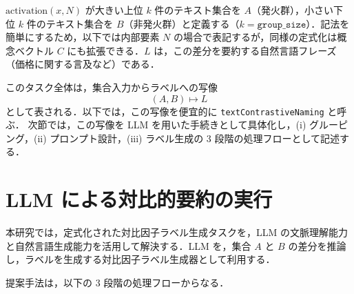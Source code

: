 $\text{activation}(x, N)$ が大きい上位 $k$ 件のテキスト集合を $A$（発火群），小さい下位 $k$ 件のテキスト集合を $B$（非発火群）と定義する（$k=\texttt{group\_size}$）．記法を簡単にするため，以下では内部要素 $N$ の場合で表記するが，同様の定式化は概念ベクトル $C$ にも拡張できる．$L$ は，この差分を要約する自然言語フレーズ（価格に関する言及など）である．

このタスク全体は，集合入力からラベルへの写像
\[
 (A, B) \mapsto L
\]
として表される．以下では，この写像を便宜的に \texttt{textContrastiveNaming} と呼ぶ．
次節では，この写像を LLM を用いた手続きとして具体化し，(i) グルーピング，(ii) プロンプト設計，(iii) ラベル生成の 3 段階の処理フローとして記述する．

\section{LLM による対比的要約の実行}

本研究では，定式化された対比因子ラベル生成タスクを，LLM の文脈理解能力と自然言語生成能力を活用して解決する．LLM を，集合 $A$ と $B$ の差分を推論し，ラベルを生成する対比因子ラベル生成器として利用する．

提案手法は，以下の 3 段階の処理フローからなる．

